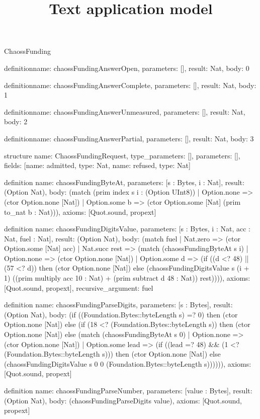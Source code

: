 \begin{lexlean}{ChaossFunding}
\title{Text application model}
\begin{semanticmodule}
definition{name: chaossFundingAnswerOpen, parameters: [], result: Nat, body: 0}

definition{name: chaossFundingAnswerComplete, parameters: [], result: Nat, body: 1}

definition{name: chaossFundingAnswerUnmeasured, parameters: [], result: Nat, body: 2}

definition{name: chaossFundingAnswerPartial, parameters: [], result: Nat, body: 3}

structure{
  name: ChaossFundingRequest,
  type_parameters: [],
  parameters: [],
  fields: [{name: admitted, type: Nat}, {name: refused, type: Nat}]
}

definition{
  name: chaossFundingByteAt,
  parameters: [s : Bytes, i : Nat],
  result: (Option Nat),
  body: (match (prim index s i : (Option UInt8))
    | Option.none => (ctor Option.none [Nat])
    | Option.some b => (ctor Option.some [Nat] (prim to_nat b : Nat))),
  axioms: [Quot.sound, propext]
}

definition{
  name: chaossFundingDigitsValue,
  parameters: [s : Bytes, i : Nat, acc : Nat, fuel : Nat],
  result: (Option Nat),
  body: (match fuel
    | Nat.zero => (ctor Option.some [Nat] acc)
    | Nat.succ rest => (match (chaossFundingByteAt s i)
      | Option.none => (ctor Option.none [Nat])
      | Option.some d => (if ((d <? 48) || (57 <? d)) then (ctor Option.none [Nat]) else (chaossFundingDigitsValue s (i + 1) ((prim multiply acc 10 : Nat) + (prim subtract d 48 : Nat)) rest)))),
  axioms: [Quot.sound, propext],
  recursive_argument: fuel
}

definition{
  name: chaossFundingParseDigits,
  parameters: [s : Bytes],
  result: (Option Nat),
  body: (if ((Foundation.Bytes::byteLength s) =? 0) then (ctor Option.none [Nat]) else (if (18 <? (Foundation.Bytes::byteLength s)) then (ctor Option.none [Nat]) else (match (chaossFundingByteAt s 0)
    | Option.none => (ctor Option.none [Nat])
    | Option.some lead => (if ((lead =? 48) && (1 <? (Foundation.Bytes::byteLength s))) then (ctor Option.none [Nat]) else (chaossFundingDigitsValue s 0 0 (Foundation.Bytes::byteLength s)))))),
  axioms: [Quot.sound, propext]
}

definition{
  name: chaossFundingParseNumber,
  parameters: [value : Bytes],
  result: (Option Nat),
  body: (chaossFundingParseDigits value),
  axioms: [Quot.sound, propext]
}


\end{semanticmodule}
\end{lexlean}

